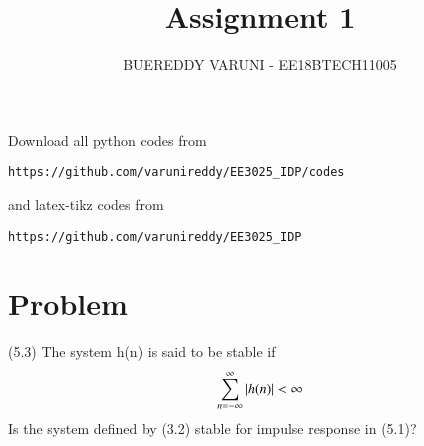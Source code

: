 \documentclass[journal,12pt,twocolumn]{IEEEtran}
\begin{document}
     \def\rightbox#1{\makebox[0in][r]{#1}}
     \def\centbox#1{\makebox[0in]{#1}}
     \def\topbox#1{\raisebox{-\baselineskip}[0in][0in]{#1}}
     \def\midbox#1{\raisebox{-0.5\baselineskip}[0in][0in]{#1}}
\vspace{3cm}
\title{Assignment 1}
\author{BUEREDDY VARUNI - EE18BTECH11005}
\maketitle
\newpage
\bigskip
\renewcommand{\thefigure}{\theenumi}
\renewcommand{\thetable}{\theenumi}
Download all python codes from 
\begin{lstlisting}
https://github.com/varunireddy/EE3025_IDP/codes
\end{lstlisting}
%
and latex-tikz codes from 
%
\begin{lstlisting}
https://github.com/varunireddy/EE3025_IDP
\end{lstlisting}
\section{Problem}
(5.3) The system h(n) is said to be stable if \\
\begin{align}
\sum_{n=-\infty}^{\infty} \left\vert h(n)\right\vert < \infty
\end{align}
Is the system defined by (3.2) stable for impulse response in (5.1)?
\end{document}
